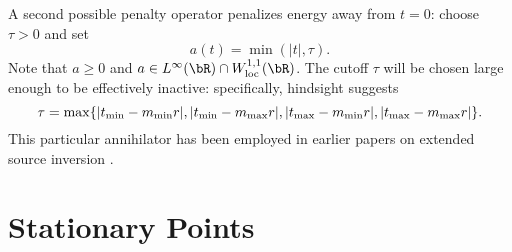 A second possible 
penalty operator penalizes energy away from 
$t=0$: choose $\tau > 0$ and set 
\begin{equation}
  \label{eqn:ann}
  a(t) = \min(|t|, \tau). 
\end{equation}
Note that $a \ge 0$ and $a \in L^{\infty}(\bR) \cap W^{1,1}_{\rm
  loc}(\bR)$. The cutoff $\tau$ will be chosen large enough to be effectively inactive: 
specifically, hindsight suggests 
\begin{equation}
  \label{eqn:taudef}
  \tau = \max\{|t_{\rm min}-m_{\rm min}r|,|t_{\rm min}-m_{\rm max}r|, |t_{\rm max}-m_{\rm min}r|, |t_{\rm max}-m_{\rm max}r|\}. 
\end{equation}
This 
particular annihilator has been employed in earlier papers on extended 
source inversion 
\cite[]{Plessix:00a,LuoSava:11,Warner:14,HuangSymes:SEG15a,Warner:16,HuangSymes:Geo17}.

\section{Stationary Points}

